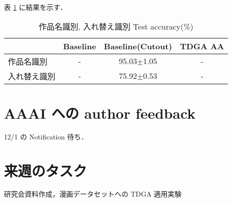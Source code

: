 \documentclass[onecolumn]{ujarticle}   %
\begin{document}
  表 \ref{tab:result_experiments} に結果を示す．
  \begin{table}[h]
		\centering
		\caption{作品名識別, 入れ替え識別 Test accuracy(\%)}
		\label{tab:result_experiments}
		\begin{tabular}{l||c c c} \hline
		  &Baseline&Baseline(Cutout)&TDGA AA\\ \hline
      作品名識別&- &95.03$\pm$1.05&-\\
      入れ替え識別&- &75.92$\pm$0.53&-\\
		\end{tabular}
	\end{table}

  \section{AAAI への author feedback}
  12/1 の Notification 待ち．


  \section{来週のタスク}
  研究会資料作成，漫画データセットへの TDGA 適用実験

\end{document}
